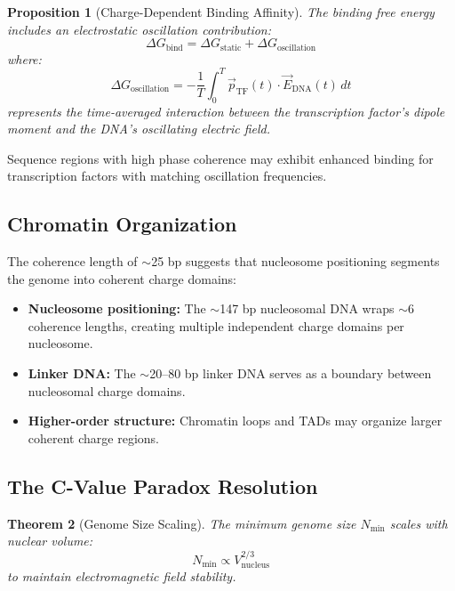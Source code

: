 \documentclass[twocolumn,10pt]{article}
\newtheorem{theorem}{Theorem}[section]
\newtheorem{proposition}[theorem]{Proposition}
\theoremstyle{remark}
\begin{document}
\begin{proposition}[Charge-Dependent Binding Affinity]
The binding free energy includes an electrostatic oscillation contribution:
\begin{equation}
\Delta G_{\mathrm{bind}} = \Delta G_{\mathrm{static}} + \Delta G_{\mathrm{oscillation}}
\end{equation}
where:
\begin{equation}
\Delta G_{\mathrm{oscillation}} = -\frac{1}{T}\int_0^T \vec{p}_{\mathrm{TF}}(t) \cdot \vec{E}_{\mathrm{DNA}}(t) \, dt
\end{equation}
represents the time-averaged interaction between the transcription factor's dipole moment and the DNA's oscillating electric field.
\end{proposition}

Sequence regions with high phase coherence may exhibit enhanced binding for transcription factors with matching oscillation frequencies.

\subsection{Chromatin Organization}

The coherence length of $\sim$25 bp suggests that nucleosome positioning segments the genome into coherent charge domains:

\begin{itemize}
\item \textbf{Nucleosome positioning:} The $\sim$147 bp nucleosomal DNA wraps $\sim$6 coherence lengths, creating multiple independent charge domains per nucleosome.

\item \textbf{Linker DNA:} The $\sim$20--80 bp linker DNA serves as a boundary between nucleosomal charge domains.

\item \textbf{Higher-order structure:} Chromatin loops and TADs may organize larger coherent charge regions.
\end{itemize}

\subsection{The C-Value Paradox Resolution}

\begin{theorem}[Genome Size Scaling]
\label{thm:genome_size}
The minimum genome size $N_{\mathrm{min}}$ scales with nuclear volume:
\begin{equation}
N_{\mathrm{min}} \propto V_{\mathrm{nucleus}}^{2/3}
\end{equation}
to maintain electromagnetic field stability.
\end{theorem}
\end{document}

